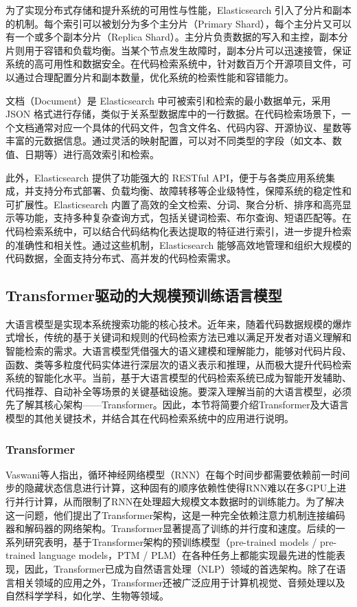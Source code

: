 \documentclass[UTF8,a4paper,12pt]{ctexart}
\numberwithin{equation}{section}
\begin{document}
为了实现分布式存储和提升系统的可用性与性能，Elasticsearch 引入了分片和副本的机制。每个索引可以被划分为多个主分片（Primary Shard），每个主分片又可以有一个或多个副本分片（Replica Shard）。主分片负责数据的写入和主控，副本分片则用于容错和负载均衡。当某个节点发生故障时，副本分片可以迅速接管，保证系统的高可用性和数据安全。在代码检索系统中，针对数百万个开源项目文件，可以通过合理配置分片和副本数量，优化系统的检索性能和容错能力。\par

文档（Document）是 Elasticsearch 中可被索引和检索的最小数据单元，采用 JSON 格式进行存储，类似于关系型数据库中的一行数据。在代码检索场景下，一个文档通常对应一个具体的代码文件，包含文件名、代码内容、开源协议、星数等丰富的元数据信息。通过灵活的映射配置，可以对不同类型的字段（如文本、数值、日期等）进行高效索引和检索。\par

此外，Elasticsearch 提供了功能强大的 RESTful API，便于与各类应用系统集成，并支持分布式部署、负载均衡、故障转移等企业级特性，保障系统的稳定性和可扩展性。Elasticsearch 内置了高效的全文检索、分词、聚合分析、排序和高亮显示等功能，支持多种复杂查询方式，包括关键词检索、布尔查询、短语匹配等。在代码检索系统中，可以结合代码结构化表达提取的特征进行索引，进一步提升检索的准确性和相关性。通过这些机制，Elasticsearch 能够高效地管理和组织大规模的代码数据，全面支持分布式、高并发的代码检索需求。\par
\subsection{Transformer驱动的大规模预训练语言模型}
大语言模型是实现本系统搜索功能的核心技术。近年来，随着代码数据规模的爆炸式增长，传统的基于关键词和规则的代码检索方法已难以满足开发者对语义理解和智能检索的需求。大语言模型凭借强大的语义建模和理解能力，能够对代码片段、函数、类等多粒度代码实体进行深层次的语义表示和推理，从而极大提升代码检索系统的智能化水平。当前，基于大语言模型的代码检索系统已成为智能开发辅助、代码推荐、自动补全等场景的关键基础设施。要深入理解当前的大语言模型，必须先了解其核心架构——Transformer。因此，本节将简要介绍Transformer及大语言模型的其他关键技术，并结合其在代码检索系统中的应用进行说明。

\subsubsection{Transformer}
Vaswani\cite{ref14}等人指出，循环神经网络模型（RNN）在每个时间步都需要依赖前一时间步的隐藏状态信息进行计算，这种固有的顺序依赖性使得RNN难以在多GPU上进行并行计算，从而限制了RNN在处理超大规模文本数据时的训练能力。为了解决这一问题，他们提出了Transformer架构，这是一种完全依赖注意力机制连接编码器和解码器的网络架构。Transformer显著提高了训练的并行度和速度。后续的一系列研究表明，基于Transformer架构的预训练模型（pre-trained models / pre-trained language models，PTM / PLM）在各种任务上都能实现最先进的性能表现，因此，Transformer已成为自然语言处理（NLP）领域的首选架构。除了在语言相关领域的应用之外，Transformer还被广泛应用于计算机视觉、音频处理以及自然科学学科，如化学、生物等领域。\par
\end{document}
